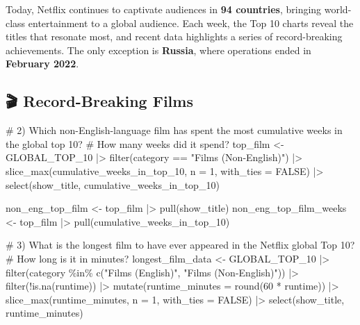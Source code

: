 \documentclass[
  12pt,
  letterpaper,
  DIV=11,
  numbers=noendperiod]{scrartcl}
\newenvironment{Shaded}{\begin{snugshade}}{\end{snugshade}}
\newcommand{\AttributeTok}[1]{\textcolor[rgb]{0.40,0.45,0.13}{#1}}
\newcommand{\CommentTok}[1]{\textcolor[rgb]{0.37,0.37,0.37}{#1}}
\newcommand{\ConstantTok}[1]{\textcolor[rgb]{0.56,0.35,0.01}{#1}}
\newcommand{\DecValTok}[1]{\textcolor[rgb]{0.68,0.00,0.00}{#1}}
\newcommand{\FunctionTok}[1]{\textcolor[rgb]{0.28,0.35,0.67}{#1}}
\newcommand{\NormalTok}[1]{\textcolor[rgb]{0.00,0.23,0.31}{#1}}
\newcommand{\OtherTok}[1]{\textcolor[rgb]{0.00,0.23,0.31}{#1}}
\newcommand{\SpecialCharTok}[1]{\textcolor[rgb]{0.37,0.37,0.37}{#1}}
\newcommand{\StringTok}[1]{\textcolor[rgb]{0.13,0.47,0.30}{#1}}
\begin{document}
Today, Netflix continues to captivate audiences in \textbf{94
countries}, bringing world-class entertainment to a global audience.
Each week, the Top 10 charts reveal the titles that resonate most, and
recent data highlights a series of record-breaking achievements. The
only exception is \textbf{Russia}, where operations ended in
\textbf{February 2022}.

\subsection{🎬 Record-Breaking Films}\label{record-breaking-films}

\begin{Shaded}
\begin{Highlighting}[]
\CommentTok{\# 2) Which non{-}English{-}language film has spent the most cumulative weeks in the global top 10? }
\CommentTok{\# How many weeks did it spend?}
\NormalTok{top\_film }\OtherTok{\textless{}{-}}\NormalTok{ GLOBAL\_TOP\_10 }\SpecialCharTok{|\textgreater{}}
  \FunctionTok{filter}\NormalTok{(category }\SpecialCharTok{==} \StringTok{"Films (Non{-}English)"}\NormalTok{) }\SpecialCharTok{|\textgreater{}}
  \FunctionTok{slice\_max}\NormalTok{(cumulative\_weeks\_in\_top\_10, }\AttributeTok{n =} \DecValTok{1}\NormalTok{, }\AttributeTok{with\_ties =} \ConstantTok{FALSE}\NormalTok{) }\SpecialCharTok{|\textgreater{}}
  \FunctionTok{select}\NormalTok{(show\_title, cumulative\_weeks\_in\_top\_10)}

\NormalTok{non\_eng\_top\_film }\OtherTok{\textless{}{-}}\NormalTok{ top\_film }\SpecialCharTok{|\textgreater{}} \FunctionTok{pull}\NormalTok{(show\_title)}
\NormalTok{non\_eng\_top\_film\_weeks }\OtherTok{\textless{}{-}}\NormalTok{ top\_film }\SpecialCharTok{|\textgreater{}} \FunctionTok{pull}\NormalTok{(cumulative\_weeks\_in\_top\_10)}

\CommentTok{\# 3) What is the longest film to have ever appeared in the Netflix global Top 10? }
\CommentTok{\# How long is it in minutes?}
\NormalTok{longest\_film\_data }\OtherTok{\textless{}{-}}\NormalTok{ GLOBAL\_TOP\_10 }\SpecialCharTok{|\textgreater{}} 
  \FunctionTok{filter}\NormalTok{(category }\SpecialCharTok{\%in\%} \FunctionTok{c}\NormalTok{(}\StringTok{"Films (English)"}\NormalTok{, }\StringTok{"Films (Non{-}English)"}\NormalTok{)) }\SpecialCharTok{|\textgreater{}} 
  \FunctionTok{filter}\NormalTok{(}\SpecialCharTok{!}\FunctionTok{is.na}\NormalTok{(runtime)) }\SpecialCharTok{|\textgreater{}} 
  \FunctionTok{mutate}\NormalTok{(}\AttributeTok{runtime\_minutes =} \FunctionTok{round}\NormalTok{(}\DecValTok{60} \SpecialCharTok{*}\NormalTok{ runtime)) }\SpecialCharTok{|\textgreater{}}     
  \FunctionTok{slice\_max}\NormalTok{(runtime\_minutes, }\AttributeTok{n =} \DecValTok{1}\NormalTok{, }\AttributeTok{with\_ties =} \ConstantTok{FALSE}\NormalTok{) }\SpecialCharTok{|\textgreater{}}  
  \FunctionTok{select}\NormalTok{(show\_title, runtime\_minutes)}


\end{Highlighting}
\end{Shaded}
\end{document}
